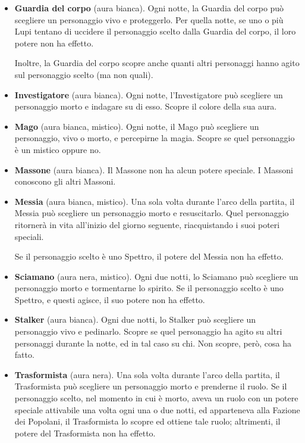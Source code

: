 \documentclass[a4paper,10pt]{article}
\begin{document}
\begin{itemize}
	\item {\bf Guardia del corpo} (aura bianca). Ogni notte, la Guardia del corpo può scegliere un personaggio vivo e proteggerlo. Per quella notte, se uno o più Lupi tentano di uccidere il personaggio scelto dalla Guardia del corpo, il loro potere non ha effetto.

	Inoltre, la Guardia del corpo scopre anche quanti altri personaggi hanno agito sul personaggio scelto (ma non quali).
 
	\item {\bf Investigatore} (aura bianca). Ogni notte, l'Investigatore può scegliere un personaggio morto e indagare su di esso. Scopre il colore della sua aura.

	\item {\bf Mago} (aura bianca, mistico). Ogni notte, il Mago può scegliere un personaggio, vivo o morto, e percepirne la magia. Scopre se quel personaggio è un mistico oppure no.
 
	\item {\bf Massone} (aura bianca). Il Massone non ha alcun potere speciale. I Massoni conoscono gli altri Massoni.
 
	\item {\bf Messia} (aura bianca, mistico). Una sola volta durante l'arco della partita, il Messia può scegliere un personaggio morto e resuscitarlo. Quel personaggio ritornerà in vita all'inizio del giorno seguente, riacquistando i suoi poteri speciali.
 
	 Se il personaggio scelto è uno Spettro, il potere del Messia non ha effetto.

	\item{\bf Sciamano} (aura nera, mistico). Ogni due notti, lo Sciamano può scegliere un personaggio morto e tormentarne lo spirito. Se il personaggio scelto è uno Spettro, e questi agisce, il suo potere non ha effetto.

	\item {\bf Stalker} (aura bianca). Ogni due notti, lo Stalker può scegliere un personaggio vivo e pedinarlo. Scopre se quel personaggio ha agito su altri personaggi durante la notte, ed in tal caso su chi. Non scopre, però, cosa ha fatto.
 

	\item {\bf Trasformista} (aura nera). Una sola volta durante l'arco della partita, il Trasformista può scegliere un personaggio morto e prenderne il ruolo. Se il personaggio scelto, nel momento in cui è morto, aveva un ruolo con un potere speciale attivabile una volta ogni una o due notti, ed apparteneva alla Fazione dei Popolani, il Trasformista lo scopre ed ottiene tale ruolo; altrimenti, il potere del Trasformista non ha effetto.
 

\end{itemize}
\end{document}
